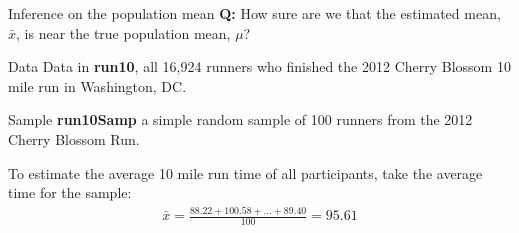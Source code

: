\documentclass[12pt,a4paper]{beamer}
\begin{document}
\begin{frame}{Inference on the population mean}
	\textbf{Q:} How sure are we that the estimated mean, $\bar{x}$, is near the true population mean, $\mu$?
\end{frame}
\begin{frame}{Data}
\small	Data in \textbf{run10}, all 16,924 runners who finished the 2012 Cherry Blossom 10 mile run in Washington, DC.
	\small
	\begin{table}[h]
	\centering
	\end{table}
	\begin{table}[h]
	\centering
	\end{table}
\end{frame}
\begin{frame}{Sample}
	\textbf{run10Samp} a simple random sample of 100 runners from the 2012 Cherry Blossom Run.
	\begin{table}
	\centering
	\end{table}
	\small To estimate the average 10 mile run time of all participants, take the average time for the sample:
	\begin{eqnarray*}
	\bar{x} = \frac{88.22 + 100.58 + \dots + 89.40}{100} = 95.61
	\end{eqnarray*}
\end{frame}
\end{document}
